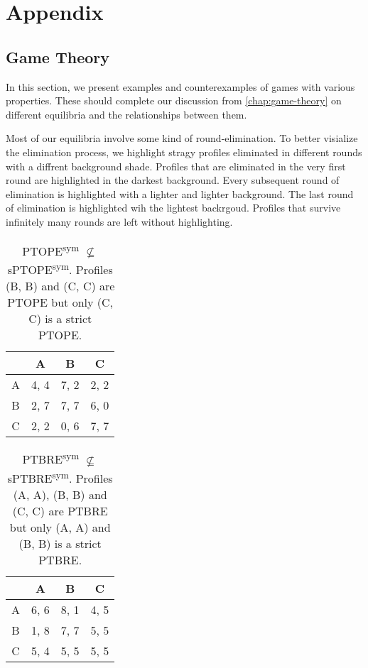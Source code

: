 \chapter{Appendix}

\section{Game Theory}
In this section, we present examples and counterexamples of games with various properties.
These should complete our discussion from \autoref{chap:game-theory} on different equilibria and the relationships between them.

Most of our equilibria involve some kind of round-elimination.
To better visialize the elimination process, we highlight stragy profiles eliminated in different rounds with a diffrent background shade.
Profiles that are eliminated in the very first round are highlighted in the \colorbox{gray!80}{darkest} background.
Every subsequent round of elimination is highlighted with a \colorbox{gray!60}{lighter} and \colorbox{gray!40}{lighter} background.
The last round of elimination is highlighted wih the \colorbox{gray!20}{lightest} backrgoud.
Profiles that survive infinitely many rounds are left without highlighting.

\begin{table}
	\caption{
		PTOPE\textsuperscript{sym} $\not\subseteq$ sPTOPE\textsuperscript{sym}.
		Profiles (B, B) and (C, C) are PTOPE but only (C, C) is a strict PTOPE.
	}
	\label{tab:ptope-not-sub-sptope}
	\centering
	\begin{tabular}{|c|c|c|c|}
		\hline
			& A		& B	   & C	  \\
		\hline
		A 		&\cellcolor{gray!00} 4, 4 &\cellcolor{gray!00} 7, 2 &\cellcolor{gray!00} 2, 2 \\
		\hline
		B		&\cellcolor{gray!00} 2, 7 &\cellcolor{gray!00} 7, 7 &\cellcolor{gray!70} 6, 0 \\
		\hline
		C		&\cellcolor{gray!00} 2, 2 &\cellcolor{gray!70} 0, 6 &\cellcolor{gray!00} 7, 7 \\
		\hline
	\end{tabular}
\end{table}

\begin{table}
	\caption{
		PTBRE\textsuperscript{sym} $\not\subseteq$ sPTBRE\textsuperscript{sym}.
		Profiles (A, A), (B, B) and (C, C) are PTBRE but only (A, A) and (B, B) is a strict PTBRE.
	}
	\label{tab:ptbre-not-sub-sptbre}
	\centering
	\begin{tabular}{|c|c|c|c|}
		\hline
			& A		& B	   & C	  \\
		\hline
		A 		&\cellcolor{gray!20} 6, 6 &\cellcolor{gray!70} 8, 1 &\cellcolor{gray!70} 4, 5 \\
		\hline
		B		&\cellcolor{gray!70} 1, 8 &\cellcolor{gray!00} 7, 7 &\cellcolor{gray!45} 5, 5 \\
		\hline
		C		&\cellcolor{gray!70} 5, 4 &\cellcolor{gray!45} 5, 5 &\cellcolor{gray!45} 5, 5 \\
		\hline
	\end{tabular}
\end{table}

